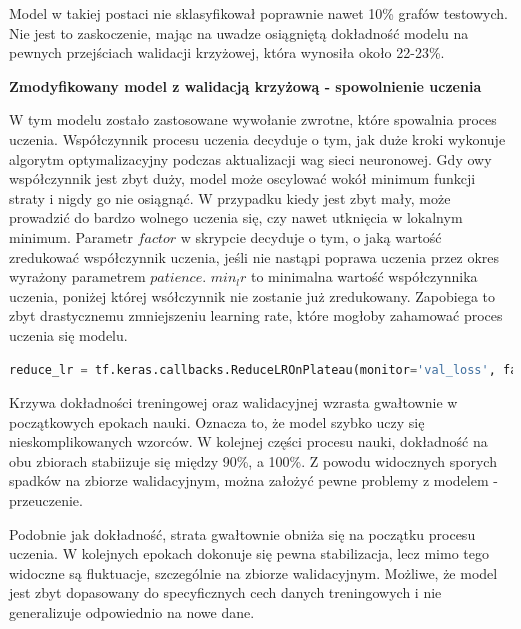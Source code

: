 Model w takiej postaci nie sklasyfikował poprawnie nawet 10\% grafów testowych.
Nie jest to zaskoczenie, mając na uwadze osiągniętą dokładność modelu na pewnych przejściach walidacji krzyżowej,
która wynosiła około 22-23\%.

\textbf{Zmodyfikowany model z walidacją krzyżową - spowolnienie uczenia}

W tym modelu zostało zastosowane wywołanie zwrotne, które spowalnia proces uczenia.
Współczynnik procesu uczenia decyduje o tym, jak duże kroki wykonuje algorytm optymalizacyjny podczas aktualizacji wag sieci neuronowej.
Gdy owy współczynnik jest zbyt duży, model może oscylować wokół minimum funkcji straty i nigdy go nie osiągnąć.
W przypadku kiedy jest zbyt mały, może prowadzić do bardzo wolnego uczenia się, czy nawet utknięcia w lokalnym minimum.
Parametr $factor$ w skrypcie decyduje o tym, o jaką wartość zredukować współczynnik uczenia,
jeśli nie nastąpi poprawa uczenia przez okres wyrażony parametrem $patience$.
$min_lr$ to minimalna wartość współczynnika uczenia, poniżej której wsółczynnik nie zostanie już zredukowany.
Zapobiega to zbyt drastycznemu zmniejszeniu learning rate, które mogłoby zahamować proces uczenia się modelu.

\begin{lstlisting}[language=Python,caption=Listing zmodyfikowanego skryptu
	znajdującego się bezpośrdenio po tworzeniu modelu z walidacją krzyżową - wersja 4,label={tests-model-crossval4}]
	reduce_lr = tf.keras.callbacks.ReduceLROnPlateau(monitor='val_loss', factor=0.2, patience=5, min_lr=0.001)
\end{lstlisting}

Krzywa dokładności treningowej oraz walidacyjnej wzrasta gwałtownie w początkowych epokach nauki.
Oznacza to, że model szybko uczy się nieskomplikowanych wzorców.
W kolejnej części procesu nauki, dokładność na obu zbiorach stabiizuje się między 90\%, a 100\%.
Z powodu widocznych sporych spadków na zbiorze walidacyjnym, można założyć pewne problemy z modelem - przeuczenie.

Podobnie jak dokładność, strata gwałtownie obniża się na początku procesu uczenia.
W kolejnych epokach dokonuje się pewna stabilizacja, lecz mimo tego widoczne są fluktuacje, szczególnie na zbiorze walidacyjnym.
Możliwe, że model jest zbyt dopasowany do specyficznych cech danych treningowych i nie generalizuje odpowiednio na nowe dane.

